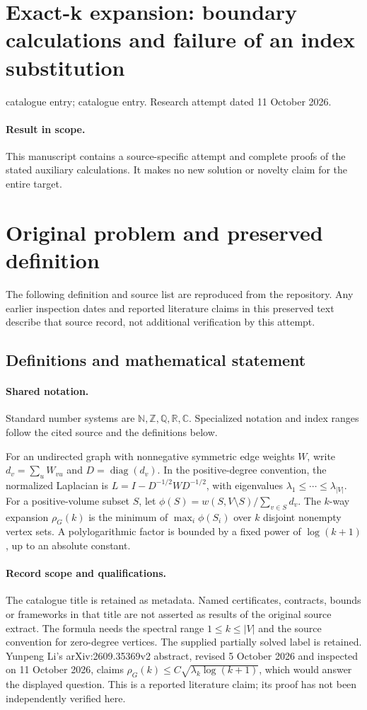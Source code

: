 \documentclass[11pt]{article}
\begin{document}
\section*{Exact-k expansion: boundary calculations and failure of an index substitution}
\noindent catalogue entry; catalogue entry. Research attempt dated 11 October 2026.
\paragraph{Result in scope.}This manuscript contains a source-specific attempt and complete proofs of the stated auxiliary calculations. It makes no new solution or novelty claim for the entire target.
\section{Original problem and preserved definition}
The following definition and source list are reproduced from the repository. Any earlier inspection dates and reported literature claims in this preserved text describe that source record, not additional verification by this attempt.
\subsection{Definitions and mathematical statement}

\paragraph{Shared notation.}Standard number systems are $\mathbb N,\mathbb Z,\mathbb Q,\mathbb R,\mathbb C$. Specialized notation and index ranges follow the cited source and the definitions below.


For an undirected graph with nonnegative symmetric edge weights $W$, write $d_v=\sum_uW_{vu}$ and $D=\operatorname{diag}(d_v)$. In the positive-degree convention, the normalized Laplacian is $L=I-D^{-1/2}WD^{-1/2}$, with eigenvalues $\lambda_1\leq\cdots\leq\lambda_{|V|}$. For a positive-volume subset $S$, let $\phi(S)=w(S,V\setminus S)/\sum_{v\in S}d_v$. The $k$-way expansion $\rho_G(k)$ is the minimum of $\max_i\phi(S_i)$ over $k$ disjoint nonempty vertex sets. A polylogarithmic factor is bounded by a fixed power of $\log(k+1)$, up to an absolute constant.
\paragraph{Record scope and qualifications.}
The catalogue title is retained as metadata. Named certificates, contracts, bounds or frameworks in that title are not asserted as results of the original source extract.
The formula needs the spectral range $1\leq k\leq|V|$ and the source convention for zero-degree vertices. The supplied partially solved label is retained. Yunpeng Li's arXiv:2609.35369v2 abstract, revised 5 October 2026 and inspected on 11 October 2026, claims $\rho_G(k)\leq C\sqrt{\lambda_k\log(k+1)}$, which would answer the displayed question. This is a reported literature claim; its proof has not been independently verified here.
\end{document}
